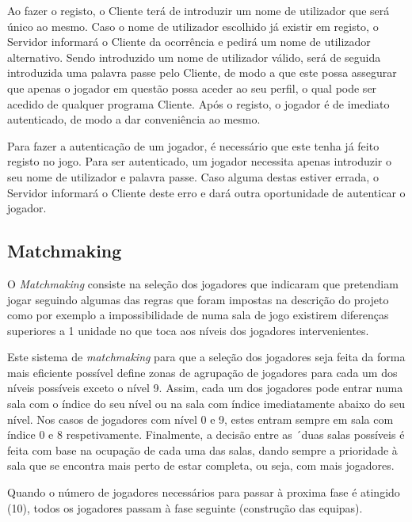 \documentclass[a4paper]{article}
\begin{document}
\par Ao fazer o registo, o Cliente terá de introduzir um nome de utilizador que será único ao mesmo. Caso o nome de utilizador escolhido já existir em registo, o Servidor informará o Cliente da ocorrência e pedirá um nome de utilizador alternativo. Sendo introduzido um nome de utilizador válido, será de seguida introduzida uma palavra passe pelo Cliente, de modo a que este possa assegurar que apenas o jogador em questão possa aceder ao seu perfil, o qual pode ser acedido de qualquer programa Cliente. Após o registo, o jogador é de imediato autenticado, de modo a dar conveniência ao mesmo.

\par Para fazer a autenticação de um jogador, é necessário que este tenha já feito registo no jogo. Para ser autenticado, um jogador necessita apenas introduzir o seu nome de utilizador e palavra passe. Caso alguma destas estiver errada, o Servidor informará o Cliente deste erro e dará outra oportunidade de autenticar o jogador. 



\subsection{Matchmaking}
\label{sec:3.2}

\hspace{3mm} O \textit{Matchmaking} consiste na seleção dos jogadores que indicaram que pretendiam jogar seguindo algumas das regras que foram impostas na descrição do projeto como por exemplo a impossibilidade de numa sala de jogo existirem diferenças superiores a 1 unidade no que toca aos níveis dos jogadores intervenientes.

\par Este sistema de \textit{matchmaking} para que a seleção dos jogadores seja feita da forma mais eficiente possível define zonas de agrupação de jogadores para cada um dos níveis possíveis exceto o nível 9. Assim, cada um dos jogadores pode entrar numa sala com o índice do seu nível ou na sala com índice imediatamente abaixo do seu nível. Nos casos de jogadores com nível 0 e 9, estes entram sempre em sala com índice 0 e 8 respetivamente. Finalmente, a decisão entre as ´duas salas possíveis é feita com base na ocupação de cada uma das salas, dando sempre a prioridade à sala que se encontra mais perto de estar completa, ou seja, com mais jogadores.

\par Quando o número de jogadores necessários para passar à proxima fase é atingido (10), todos os jogadores passam à fase seguinte (construção das equipas).
\end{document}
